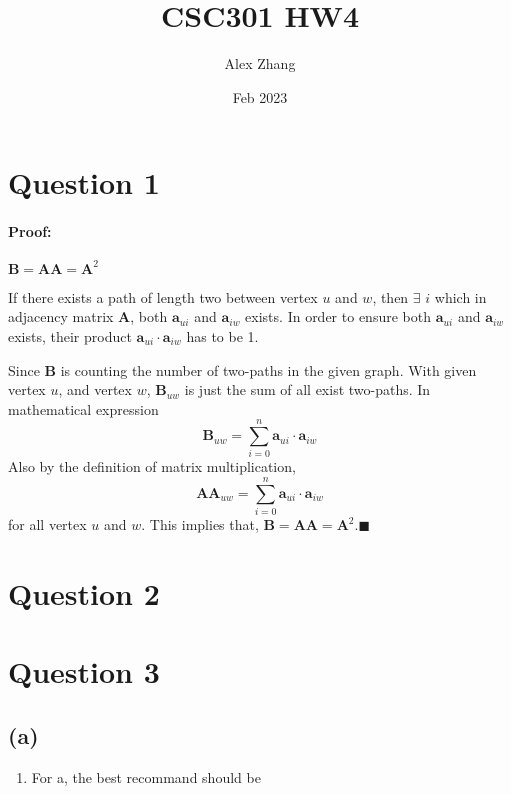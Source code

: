 \documentclass{article}
\title{CSC301 HW4}
\author{Alex Zhang}
\date{Feb 2023}
\newcommand{\mat}[1]{\mathbf{#1}}
\begin{document}
\maketitle
\section*{Question 1}
\paragraph{Proof:} $\mat{B} = \mat{A}\mat{A} = \mat{A}^2$

If there exists a path of length two between vertex $u$ and $w$, then $\exists $ $i$ which 
in adjacency matrix $\mat{A}$, both $\mat{a}_{ui}$ and $\mat{a}_{iw}$ exists.
In order to ensure both $\mat{a}_{ui}$ and $\mat{a}_{iw}$ exists, their product $\mat{a}_{ui} \cdot \mat{a}_{iw}$
has to be 1.

Since $\mat{B}$ is counting the number of two-paths in the given graph. With given vertex $u$, and vertex $w$, $\mat{B}_{uw}$
is just the sum of all exist two-paths. In mathematical expression $$\mat{B}_{uw} = \sum^{n}_{i=0}\mat{a}_{ui}\cdot \mat{a}_{iw}$$
Also by the definition of matrix multiplication, 
$$\mat{A}\mat{A}_{uw} = \sum^{n}_{i=0}\mat{a}_{ui}\cdot \mat{a}_{iw}$$
for all vertex $u$ and $w$. This implies that,
$\mat{B} = \mat{A}\mat{A} = \mat{A}^2$.$\blacksquare$

\section*{Question 2}


\section*{Question 3}
\subsection*{(a)}
\begin{enumerate}
    \item For a, the best recommand should be  
\end{enumerate}
\end{document}
